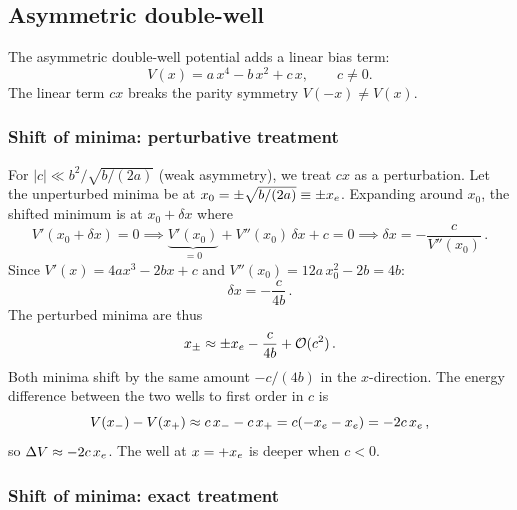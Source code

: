 \subsection{Asymmetric double-well}\label{sec:V_asym}

The asymmetric double-well potential adds a linear bias term:
\begin{equation}\label{eq:V_asym}
  V(x) = a\,x^4 - b\,x^2 + c\,x, \qquad c \neq 0.
\end{equation}
The linear term $cx$ breaks the parity symmetry $V(-x) \neq V(x)$.

\subsubsection{Shift of minima: perturbative treatment}

For $|c| \ll b^2/\sqrt{b/(2a)}$ (weak asymmetry), we treat $cx$ as a perturbation.
Let the unperturbed minima be at $x_0 = \pm\sqrt{b/(2a)} \equiv \pm x_e$.
Expanding around $x_0$, the shifted minimum is at $x_0 + \delta x$ where
\begin{equation}
  V'(x_0 + \delta x) = 0 \implies
  \underbrace{V'(x_0)}_{=0} + V''(x_0)\,\delta x + c = 0
  \implies \delta x = -\frac{c}{V''(x_0)}\,.
\end{equation}
Since $V'(x) = 4ax^3 - 2bx + c$ and $V''(x_0) = 12a\,x_0^2 - 2b = 4b$:
\begin{equation}
  \delta x = -\frac{c}{4b}\,.
\end{equation}
The perturbed minima are thus
\begin{equation}\label{eq:xmin_pert}
  x_{\pm} \approx \pm x_e - \frac{c}{4b} + \mathcal{O}(c^2)\,.
\end{equation}
Both minima shift by the same amount $-c/(4b)$ in the $x$-direction.
The energy difference between the two wells to first order in $c$ is
\begin{equation}
  V(x_-) - V(x_+) \approx c\,x_- - c\,x_+
  = c(-x_e - x_e) = -2c\,x_e\,,
\end{equation}
so $\Delta V \approx -2c\,x_e$. The well at $x = +x_e$ is deeper when $c < 0$.

\subsubsection{Shift of minima: exact treatment}

